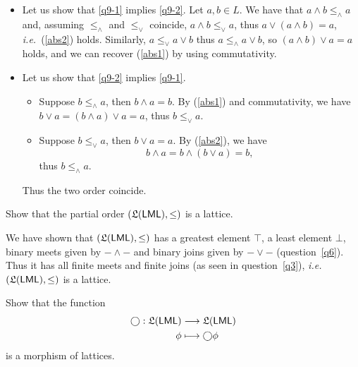 \documentclass[fontsize=16pt,a4paper,DIV=17,parskip=half]{scrartcl}
\renewcommand{\mathsf}[1]{\textup{\textsf{#1}}}
\theoremstyle{definition}
\begin{document}
  \begin{itemize}
    \item Let us show that \ref{q9-1} implies \ref{q9-2}.
      Let $a, b \in L$.
      We have that $a \wedge b \le_\wedge a$ and, assuming $\le_\wedge$ and $\le_\vee$ coincide, $a \wedge b \le_\vee a$, thus $a \vee (a \wedge b) = a$, \textit{i.e.}\ (\ref{abs2}) holds.
      Similarly,  $a \le_\vee a \vee b$ thus $a \le_\wedge a \vee b$, so $(a \wedge b) \vee a = a$ holds, and we can recover (\ref{abs1}) by using commutativity.
    \item Let us show that \ref{q9-2} implies \ref{q9-1}.
      \begin{itemize}
        \item Suppose $b \le_\wedge a$, then $b \wedge a = b$.
          By (\ref{abs1}) and commutativity, we have $b \vee a = (b \wedge a) \vee a = a$, thus $b \le_\vee a$.
        \item Suppose $b \le_\vee a$, then $b \vee a = a$.
          By (\ref{abs2}), we have
          \[
          b \wedge a = b \wedge (b \vee a) = b
          ,\] thus $b \le_\wedge a$.
      \end{itemize}
      Thus the two order coincide.
  \end{itemize}

  \begin{que}
    Show that the partial order $(\mathfrak L (\mathsf{LML}), \le )$ is a lattice.
  \end{que}

  We have shown that $(\mathfrak L (\mathsf{LML}), \le )$ has a greatest element $\top$, a least element $\bot$, binary meets given by $- \wedge -$ and binary joins given by  $- \vee -$ (question~\ref{q6}).
  Thus it has all finite meets and finite joins (as seen in question~\ref{q3}),  \textit{i.e.}\ $(\mathfrak{L}(\mathsf{LML}), \le)$ is a lattice.
  \let\nxt\bigcirc

  \begin{que}
    Show that the function
    \begin{align*}
      \nxt: \mathfrak{L}(\mathsf{LML}) &\longrightarrow \mathfrak{L}(\mathsf{LML}) \\
      \phi &\longmapsto \nxt\phi
    \end{align*}
    is a morphism of lattices.
  \end{que}
\end{document}
